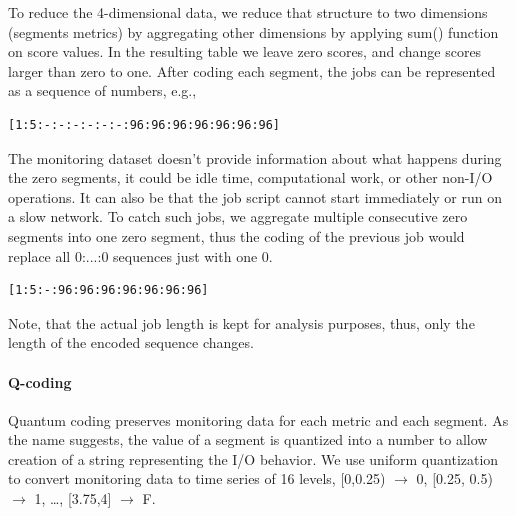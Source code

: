 \documentclass{jhps}
\begin{document}
To reduce the 4-dimensional data, we reduce that structure to two dimensions (segments metrics) by aggregating other dimensions by applying sum() function on score values.
In the resulting table we leave zero scores, and change scores larger than zero to one.
After coding each segment, the jobs can be represented as a sequence of numbers, e.g.,

\begin{lstlisting}[caption={B-coding of a 15 segments long job.}]
[1:5:-:-:-:-:-:-:96:96:96:96:96:96:96]
\end{lstlisting}

The monitoring dataset doesn't provide information about what happens during the zero segments, it could be idle time, computational work, or other non-I/O operations.
It can also be that the job script cannot start immediately or run on a slow network.
To catch such jobs, we aggregate multiple consecutive zero segments into one zero segment, thus the coding of the previous job would replace all 0:...:0 sequences just with one 0.

\begin{lstlisting}[caption={B-coding of a 15 segments long job with zero aggregation applied.}]
[1:5:-:96:96:96:96:96:96:96]
\end{lstlisting}

Note, that the actual job length is kept for analysis purposes, thus, only the length of the encoded sequence changes.

\paragraph*{Q-coding}
Quantum coding preserves monitoring data for each metric and each segment.
As the name suggests, the value of a segment is quantized into a number to allow creation of a string representing the I/O behavior.
We use uniform quantization to convert monitoring data to time series of 16 levels, [0,0.25) $\rightarrow$ 0, [0.25, 0.5) $\rightarrow$ 1, \dots, [3.75,4] $\rightarrow$ F.

\end{document}
